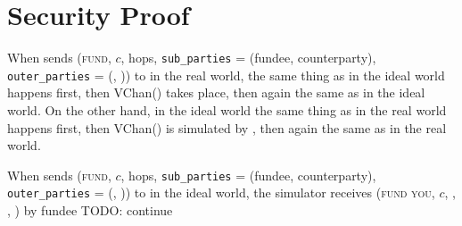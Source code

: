 \section{Security Proof}
  When \environment sends (\textsc{fund}, $c$, hops, \texttt{sub\_parties} =
  (fundee, counterparty), \texttt{outer\_parties} = (\charlie, \dave)) to \alice
  in the real world, the same thing as in the ideal world happens first, then
  VChan() takes place, then again the same as in the ideal world. On the other
  hand, in the ideal world the same thing as in the real world happens first,
  then VChan() is simulated by \simulator, then again the same as in the real
  world.

  When \environment sends (\textsc{fund}, $c$, hops, \texttt{sub\_parties} =
  (fundee, counterparty), \texttt{outer\_parties} = (\charlie, \dave)) to \alice
  in the ideal world, the simulator receives (\textsc{fund you}, $c$, \bob,
  \charlie, \alice) by fundee TODO: continue
